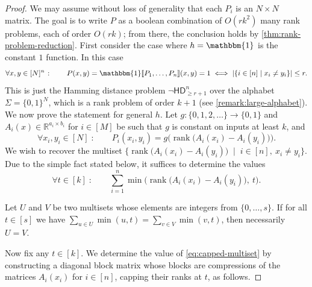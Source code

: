 \documentclass{article}
\DeclareMathOperator{\rank}{rank}
\newcommand{\HD}[1]{\mathsf{HD}_{#1}}
\newcommand{\R}{\mathbb{R}}
\begin{document}
\begin{proof}
We may assume without loss of generality that each $P_i$ is an $N \times N$
matrix. The goal is to write $P$ as a boolean combination of $O(rk^2)$ many rank
problems, each of order $O(rk)$; from there, the conclusion holds by
\cref{thm:rank-problem-reduction}. First consider the case where $h =
\mathbbm{1}$ is the constant $1$ function. In this case
\[
  \forall x,y\in[N]^n \;\colon\qquad
    P(x,y) = \mathbbm{1} \ldsbracket P_1, \dotsc, P_n \rdsbracket (x,y) = 1 \iff |\{i\in [n] \mid x_i\neq y_i\}| \leq r .
\]
This is just the Hamming distance problem $\neg \HD{\geq r+1}^n$ over the  alphabet
$\Sigma = \{0,1\}^N$, which is a rank problem of order $k+1$ (see
\cref{remark:large-alphabet}). We now prove the statement for general $h$. Let $g \colon
\{0,1,2,\dotsc\}\to \{0,1\}$ and $A_i(x) \in\R^{a_i\times b_i}$ for $i\in [M]$
be such that $g$ is constant on inputs at least $k$, and
\[
	\forall x_i, y_i \in[N] \;\colon\qquad P_i(x_i, y_i) = g\Big(\rank\!\big(A_i(x_i)-A_i(y_i)\big)\Big).
\]
We wish to recover the multiset $\big\{ \rank\!\big(A_i(x_i) - A_i(y_i)\big) \;\mid\; i \in [n],\ 
	x_i \neq y_i \big\}$.
Due to the simple fact stated below, it suffices to determine the values
\begin{equation}
\label{eq:capped-multiset}
    \forall t \in [k] \;\colon\qquad \sum_{i=1}^n \min\Big( \rank\!\big(A_i(x_i) - A_i(y_i)\big),\ t \Big).
\end{equation}

\begin{fact}\label{fact:multiset}
Let $U$ and $V$ be two multisets whose elements are integers from $\{0, \dotsc, s\}$. If for all $t \in [s]$ we have $\sum_{u \in U} \min(u, t) = \sum_{v \in V} \min(v, t)$, then necessarily $U = V$.
\end{fact}
Now fix any $t \in [k]$. We determine the value of \cref{eq:capped-multiset} by constructing a diagonal block matrix whose blocks are compressions of the matrices $A_i(x_i)$ for $i\in [n]$, capping their ranks at $t$, as follows. 


\end{proof}
\end{document}

